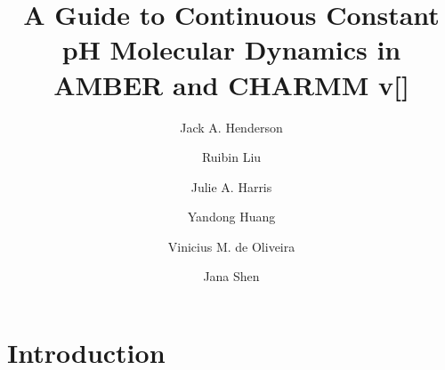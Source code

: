 \documentclass[9pt,tutorial]{livecoms}
\title{A Guide to Continuous Constant pH Molecular Dynamics in AMBER and CHARMM v[\versionnumber]}
\author[1]{Jack A. Henderson}
\author[1]{Ruibin Liu}
\author[1,\authfn{2}]{Julie A. Harris}
\author[1,\authfn{3}]{Yandong Huang}
\author[1]{Vinicius M. de Oliveira}
\author[1*]{Jana Shen}
\affil[1]{University of Maryland School of Pharmacy, Baltimore, MD}
\begin{document}
\begin{frontmatter}
\maketitle

\begin{abstract}



\end{abstract}

\end{frontmatter}

\section{Introduction} %
\end{document}
